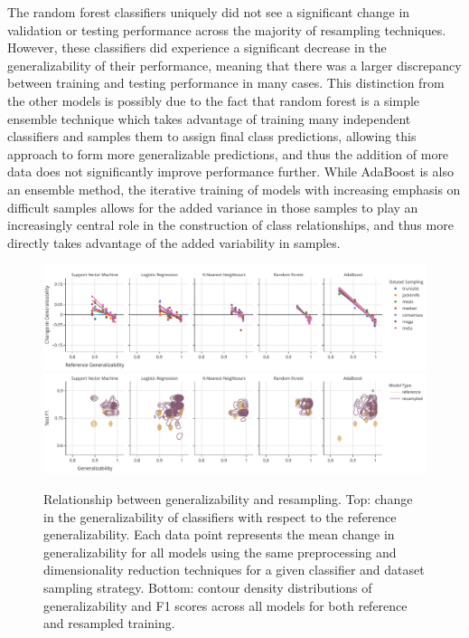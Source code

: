 \documentclass[10pt]{SelfArx} %
\begin{document}
The random forest classifiers uniquely did not see a significant change in validation or testing performance across the
majority of resampling techniques. However, these classifiers did experience a significant decrease in the
generalizability of their performance, meaning that there was a larger discrepancy between training and testing
performance in many cases. This distinction from the other models is possibly due to the fact that random forest is a
simple ensemble technique which takes advantage of training many independent classifiers and samples them to assign
final class predictions, allowing this approach to form more generalizable predictions, and thus the addition of more
data does not significantly improve performance further. While AdaBoost is also an ensemble method, the iterative
training of models with increasing emphasis on difficult samples allows for the added variance in those samples to play
an increasingly central role in the construction of class relationships, and thus more directly takes advantage of the
added variability in samples.

\begin{figure}[bht!]\centering
\includegraphics[width=\linewidth]{figures/2a.pdf}
\includegraphics[width=\linewidth]{figures/2b.pdf}
\caption{Relationship between generalizability and resampling. Top: change in the generalizability of classifiers with
respect to the reference generalizability. Each data point represents the mean change in generalizability for all
models using the same preprocessing and dimensionality reduction techniques for a given classifier and dataset sampling
strategy. Bottom: contour density distributions of generalizability and F1 scores across all models for both reference
and resampled training.
}
\label{fig:change_in_gen}
\end{figure}
\end{document}
